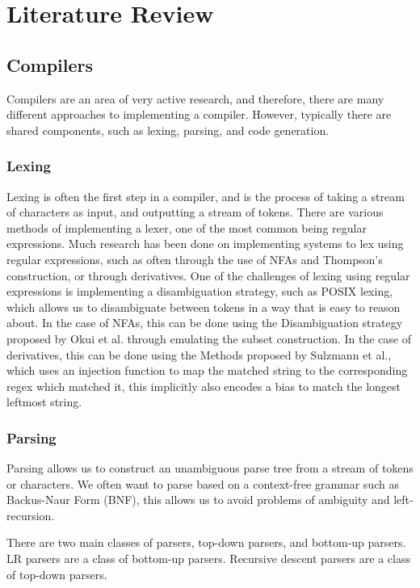 \chapter*{Literature Review}

\section*{Compilers}
Compilers are an area of very active research, and therefore, there are many different approaches to implementing a compiler.
However, typically there are shared components, such as lexing, parsing, and code generation\cite{Compiler}.

\subsection*{Lexing}
Lexing is often the first step in a compiler\cite{M4}, and is the process of taking a stream of characters as input, and outputting a stream of tokens.
There are various methods of implementing a lexer, one of the most common being regular expressions.
Much research has been done on implementing systems to lex using regular expressions, such as often through the use of NFAs and Thompson's construction, or through derivatives.
One of the challenges of lexing using regular expressions is implementing a disambiguation strategy, such as POSIX lexing, which allows us to disambiguate between tokens in a way that is easy to reason about.
In the case of NFAs, this can be done using the Disambiguation strategy proposed by Okui et al.\cite{Okui} through emulating the subset construction.
In the case of derivatives, this can be done using the Methods proposed by Sulzmann et al.\cite{Sulzmann}, which uses an injection function to map the matched string to the corresponding regex which matched it, this implicitly also encodes a bias to match the longest leftmost string.

\subsection*{Parsing}
Parsing allows us to construct an unambiguous parse tree from a stream of tokens or characters\cite{Compiler}.
We often want to parse based on a context-free grammar such as Backus-Naur Form (BNF), this allows us to avoid problems of ambiguity and left-recursion.

There are two main classes of parsers, top-down parsers, and bottom-up parsers.
LR parsers are a class of bottom-up parsers\cite{KnuthLRParsing}.
Recursive descent parsers are a class of top-down parsers\cite{topdownparse, parsercombinators}.

